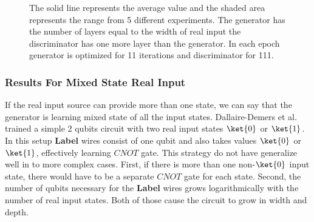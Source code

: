 \begin{figure}[htbp!]
  \caption{The solid line represents the average value and the shaded area
    represents the range from 5 different experiments. The generator has the
    number of layers equal to the width of real input the discriminator has one
    more layer than the generator. In each epoch generator is optimized for 11 iterations and
  discriminator for 111. }
  \label{fig:sqgans_res_3}
\end{figure}
\subsubsection{Results For Mixed State Real Input}
If the real input source can provide more than one state, we can say that the
generator is learning mixed state of all the input states. Dallaire-Demers et
al. \cite{Dallaire_Demers_2018} trained a simple 2 qubits circuit with two real
input states $\ket{0}$ or $\ket{1}$. In this setup \textbf{Label} wires consist
of one qubit and also takes values $\ket{0}$ or $\ket{1}$, effectively learning
$CNOT$ gate. This strategy do not have generalize well in to more complex cases.
First, if there is more than one non-$\ket{0}$ input state, there would have to
be a separate $CNOT$ gate for each state. Second, the number of qubits necessary
for the \textbf{Label} wires grows logarithmically with the number of real input
states. Both of those cause the circuit to grow in width and depth.

